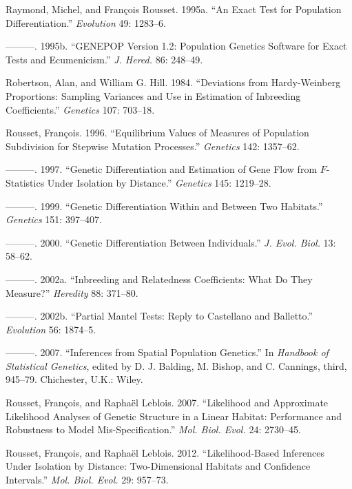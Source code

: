 \documentclass[12pt,]{book}
\begin{document}
\hypertarget{ref-RaymondR95evol}{}
Raymond, Michel, and François Rousset. 1995a. ``An Exact Test for
Population Differentiation.'' \emph{Evolution} 49: 1283--6.

\hypertarget{ref-RaymondR95}{}
---------. 1995b. ``GENEPOP Version 1.2: Population Genetics Software
for Exact Tests and Ecumenicism.'' \emph{J. Hered.} 86: 248--49.

\hypertarget{ref-RobertsonH84}{}
Robertson, Alan, and William G. Hill. 1984. ``Deviations from
Hardy-Weinberg Proportions: Sampling Variances and Use in Estimation of
Inbreeding Coefficients.'' \emph{Genetics} 107: 703--18.

\hypertarget{ref-Rousset96}{}
Rousset, François. 1996. ``Equilibrium Values of Measures of Population
Subdivision for Stepwise Mutation Processes.'' \emph{Genetics} 142:
1357--62.

\hypertarget{ref-Rousset97}{}
---------. 1997. ``Genetic Differentiation and Estimation of Gene Flow
from \(F\)-Statistics Under Isolation by Distance.'' \emph{Genetics}
145: 1219--28.

\hypertarget{ref-Rousset99g}{}
---------. 1999. ``Genetic Differentiation Within and Between Two
Habitats.'' \emph{Genetics} 151: 397--407.

\hypertarget{ref-Rousset00}{}
---------. 2000. ``Genetic Differentiation Between Individuals.''
\emph{J. Evol. Biol.} 13: 58--62.

\hypertarget{ref-Rousset02h}{}
---------. 2002a. ``Inbreeding and Relatedness Coefficients: What Do
They Measure?'' \emph{Heredity} 88: 371--80.

\hypertarget{ref-Rousset02e}{}
---------. 2002b. ``Partial Mantel Tests: Reply to Castellano and
Balletto.'' \emph{Evolution} 56: 1874--5.

\hypertarget{ref-Rousset07w}{}
---------. 2007. ``Inferences from Spatial Population Genetics.'' In
\emph{Handbook of Statistical Genetics}, edited by D. J. Balding, M.
Bishop, and C. Cannings, third, 945--79. Chichester, U.K.: Wiley.

\hypertarget{ref-RoussetL07}{}
Rousset, François, and Raphaël Leblois. 2007. ``Likelihood and
Approximate Likelihood Analyses of Genetic Structure in a Linear
Habitat: Performance and Robustness to Model Mis-Specification.''
\emph{Mol. Biol. Evol.} 24: 2730--45.

\hypertarget{ref-RoussetL12}{}
Rousset, François, and Raphaël Leblois. 2012. ``Likelihood-Based
Inferences Under Isolation by Distance: Two-Dimensional Habitats and
Confidence Intervals.'' \emph{Mol. Biol. Evol.} 29: 957--73.
\end{document}
